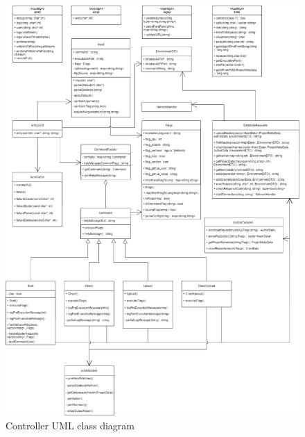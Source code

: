 \documentclass{article}
\begin{document}
\begin{figure}
    \centering
    \includegraphics[width = \linewidth]{ControllerUML.png}
    \caption{Controller UML class diagram}
    \label{fig:umlcontroller}
\end{figure}
\end{document}
